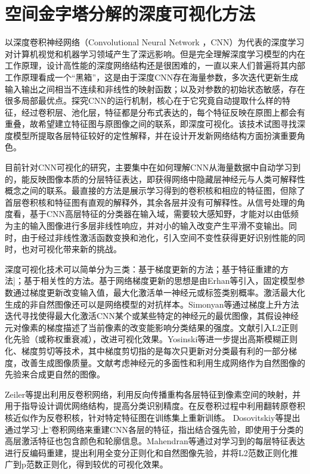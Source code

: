 \chapter{空间金字塔分解的深度可视化方法}
\label{chap:visualization}

以深度卷积神经网络（Convolutional Neural Network ，CNN）为代表的深度学习对计算机视觉和机器学习领域产生了深远影响。但是完全理解深度学习模型的内在工作原理，设计高性能的深度网络结构还是很困难的，一直以来人们普遍将其内部工作原理看成一个“黑箱”，这是由于深度CNN存在海量参数，多次迭代更新生成输入输出之间相当不连续和非线性的映射函数；以及对参数的初始状态敏感，存在很多局部最优点。探究CNN的运行机制，核心在于它究竟自动提取什么样的特征，经过卷积层、池化层，特征都是分布式表达的，每个特征反映在原图上都会有重叠，故希望建立特征图与原图像之间的联系，即深度可视化。该技术试图寻找深度模型所提取各层特征较好的定性解释，并在设计开发新网络结构方面扮演重要角色。


目前针对CNN可视化的研究，主要集中在如何理解CNN从海量数据中自动学习到的，能反映图像本质的分层特征表达，即获得网络中隐藏层神经元与人类可解释性概念之间的联系。最直接的方法是展示学习得到的卷积核和相应的特征图，但除了首层卷积核和特征图有直观的解释外，其余各层并没有可解释性。从信号处理的角度看，基于CNN高层特征的分类器在输入域，需要较大感知野，才能对以由低频为主的输入图像进行多层非线性响应，并对小的输入改变产生平滑不变输出。同时，由于经过非线性激活函数变换和池化，引入空间不变性获得更好识别性能的同时，也对可视化带来新的挑战。


深度可视化技术可以简单分为三类：基于梯度更新的方法\citep{Erhan2009,simonyan14deep,Lenc2015,Szegedy2013a,JasonYosinski2015,Nguyen2016a,Nguyen2016b}；基于特征重建的方法\citep{Zeiler2014,Brox,Mahendran2015d,Mahendran2015}]；基于相关性的方法\citep{Cao2015,Bach2016}。基于网络梯度更新的思想是由Erhan等\citep{Erhan2009}引入，固定模型参数通过梯度更新改变输入值，最大化激活单一神经元或标签类别概率。激活最大化生成的非自然图像还可以是网络模型的对抗样本\citep{Goodfellow2014}。Simonyan等\citep{simonyan14deep,Lenc2015,Szegedy2013a}通过梯度上升方法迭代寻找使得最大化激活CNN某个或某些特定的神经元的最优图像，其假设神经元对像素的梯度描述了当前像素的改变能影响分类结果的强度。文献引入L2正则化先验（或称权重衰减），改进可视化效果。Yosinski等\citep{JasonYosinski2015}进一步提出高斯模糊正则化、梯度剪切等技术，其中梯度剪切指的是每次只更新对分类最有利的一部分梯度，改善生成图像质量。文献考虑神经元的多面性和利用生成网络作为自然图像的先验来合成更自然的图像。

Zeiler等\citep{Zeiler2014}提出利用反卷积网络，利用反向传播重构各层特征到像素空间的映射，并用于指导设计调优网络结构，提高分类识别精度。在反卷积过程中利用翻转原卷积核近似作为反卷积核，针对特定特征图在训练集上重新训练。
Dosovitskiy等\citep{Brox}提出通过学习‘上’卷积网络来重建CNN各层的特征，指出结合强先验，即使用于分类的高层激活特征也包含颜色和轮廓信息。Mahendran等\citep{Mahendran2015d,Mahendran2015}通过对学习到的每层特征表达进行反编码重建，提出利用全变分正则化和自然图像先验，并将L2范数正则化推广到p范数正则化，得到较优的可视化效果。


